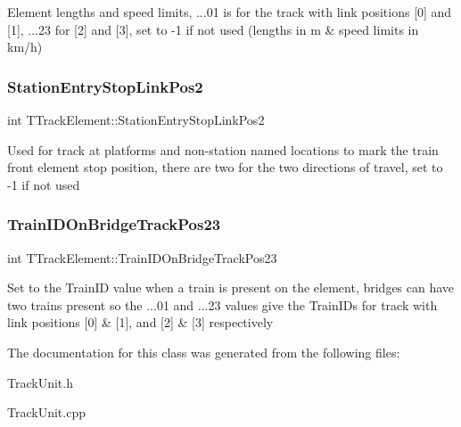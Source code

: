Element lengths and speed limits, ...01 is for the track with link positions \mbox{[}0\mbox{]} and \mbox{[}1\mbox{]}, ...23 for \mbox{[}2\mbox{]} and \mbox{[}3\mbox{]}, set to -\/1 if not used (lengths in m \& speed limits in km/h) \mbox{\label{class_t_track_element_af6b589b13c3b59adb3c493816316ffe1}} 
\subsubsection{\texorpdfstring{Station\+Entry\+Stop\+Link\+Pos2}{StationEntryStopLinkPos2}}
{\footnotesize\ttfamily int T\+Track\+Element\+::\+Station\+Entry\+Stop\+Link\+Pos2}

Used for track at platforms and non-\/station named locations to mark the train front element stop position, there are two for the two directions of travel, set to -\/1 if not used \mbox{\label{class_t_track_element_aa3d8b1fef605f7ef4e6b09360abbb528}} 
\subsubsection{\texorpdfstring{Train\+I\+D\+On\+Bridge\+Track\+Pos23}{TrainIDOnBridgeTrackPos23}}
{\footnotesize\ttfamily int T\+Track\+Element\+::\+Train\+I\+D\+On\+Bridge\+Track\+Pos23}

Set to the Train\+ID value when a train is present on the element, bridges can have two trains present so the ...01 and ...23 values give the Train\+I\+Ds for track with link positions \mbox{[}0\mbox{]} \& \mbox{[}1\mbox{]}, and \mbox{[}2\mbox{]} \& \mbox{[}3\mbox{]} respectively 

The documentation for this class was generated from the following files\+:\begin{DoxyCompactItemize}
\item 
Track\+Unit.\+h\item 
Track\+Unit.\+cpp\end{DoxyCompactItemize}
